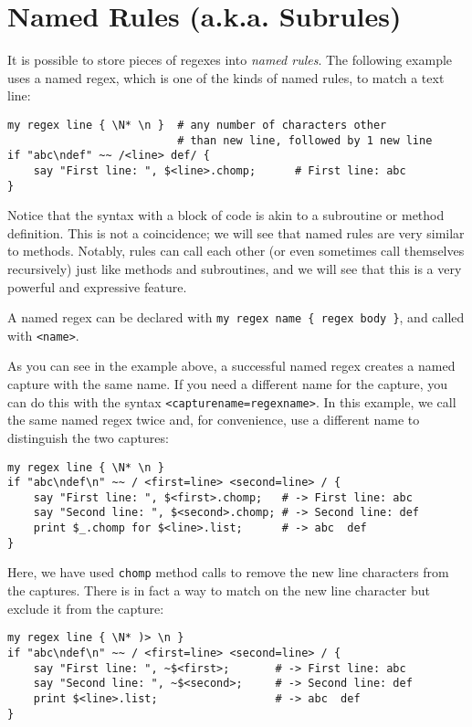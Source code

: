 \section{Named Rules (a.k.a. Subrules)}
\label{subrules}

It is possible to store pieces of regexes into \emph{named rules}. The following example uses a named regex, which 
is one of the kinds of named rules, to match a text line:

\begin{verbatim}
my regex line { \N* \n }  # any number of characters other 
                          # than new line, followed by 1 new line
if "abc\ndef" ~~ /<line> def/ {
    say "First line: ", $<line>.chomp;      # First line: abc
}
\end{verbatim} 

Notice that the syntax with a block of code is akin 
to a subroutine or method definition. This is not a 
coincidence; we will see that named rules are very 
similar to methods. Notably, rules can call 
each other (or even sometimes call themselves 
recursively) just like methods and subroutines, and we will see 
that this is a very powerful and expressive feature.

A named regex can be declared with 
\verb'my regex name { regex body }', and called with 
{\tt <name>}. 

As you can see in the example above, a successful named 
regex creates a named capture with the same name. If you 
need a different name for the capture, you can do this 
with the syntax {\tt <capturename=regexname>}. In this 
example, we call the same named regex twice and, 
for convenience, use a different name to distinguish 
the two captures:

\begin{verbatim}
my regex line { \N* \n }
if "abc\ndef\n" ~~ / <first=line> <second=line> / {
    say "First line: ", $<first>.chomp;   # -> First line: abc
    say "Second line: ", $<second>.chomp; # -> Second line: def
    print $_.chomp for $<line>.list;      # -> abc  def
}
\end{verbatim}

Here, we have used {\tt chomp} method calls to remove 
the new line characters from the captures. There is in 
fact a way to match on the new line character but exclude 
it from the capture:
\begin{verbatim}
my regex line { \N* )> \n }
if "abc\ndef\n" ~~ / <first=line> <second=line> / {
    say "First line: ", ~$<first>;       # -> First line: abc
    say "Second line: ", ~$<second>;     # -> Second line: def
    print $<line>.list;                  # -> abc  def
}
\end{verbatim}

